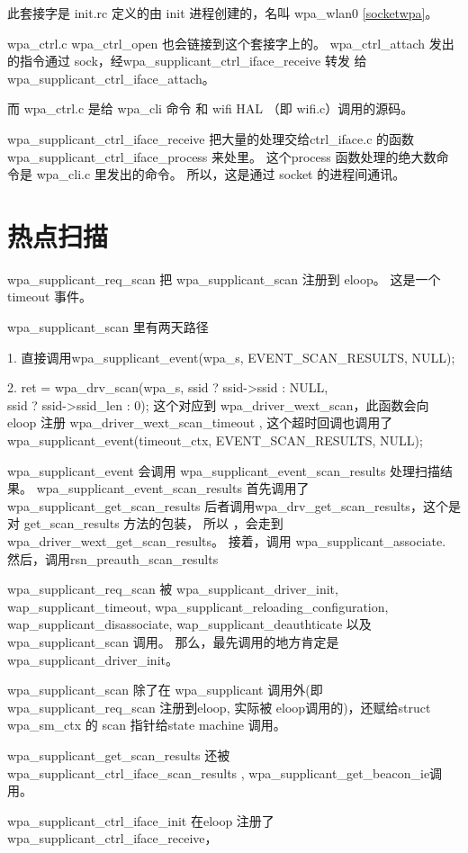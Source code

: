 \documentclass[a4paper,11pt,]{article}%
\begin{document}
此套接字是 init.rc 定义的由 init 进程创建的，名叫 wpa_wlan0 \autoref{socketwpa}。

wpa_ctrl.c wpa_ctrl_open 也会链接到这个套接字上的。
wpa_ctrl_attach 发出的指令通过 sock，经wpa_supplicant_ctrl_iface_receive 转发
给wpa_supplicant_ctrl_iface_attach。

而 wpa_ctrl.c 是给 wpa_cli 命令 和 wifi HAL （即 wifi.c）调用的源码。

wpa_supplicant_ctrl_iface_receive 把大量的处理交给ctrl_iface.c 的函数
wpa_supplicant_ctrl_iface_process 来处里。
这个process 函数处理的绝大数命令是 wpa_cli.c 里发出的命令。
所以，这是通过 socket 的进程间通讯。
\section{热点扫描}

wpa_supplicant_req_scan 把 wpa_supplicant_scan 注册到 eloop。
这是一个timeout 事件。

wpa_supplicant_scan\label{scan} 里有两天路径

1. 直接调用wpa_supplicant_event(wpa_s, EVENT_SCAN_RESULTS, NULL);

2.	ret = wpa_drv_scan(wpa_s, ssid ? ssid->ssid : NULL,\\
				   ssid ? ssid->ssid_len : 0); 
这个对应到 wpa_driver_wext_scan，此函数会向 eloop 注册 wpa_driver_wext_scan_timeout
, 这个超时回调也调用了wpa_supplicant_event(timeout_ctx, EVENT_SCAN_RESULTS, NULL);

wpa_supplicant_event 会调用 wpa_supplicant_event_scan_results 处理扫描结果。
 wpa_supplicant_event_scan_results 首先调用了 wpa_supplicant_get_scan_results
后者调用wpa_drv_get_scan_results，这个是对 get_scan_results 方法的包装， 所以
，会走到 wpa_driver_wext_get_scan_results。
接着，调用 wpa_supplicant_associate.  
然后，调用rsn_preauth_scan_results

wpa_supplicant_req_scan
被 wpa_supplicant_driver_init,
wap_supplicant_timeout,
wpa_supplicant_reloading_configuration,
wap_supplicant_disassociate,
wap_supplicant_deauthticate
以及 wpa_supplicant_scan 调用。
那么，最先调用的地方肯定是 wpa_supplicant_driver_init。

wpa_supplicant_scan
除了在 wpa_supplicant 调用外(即wpa_supplicant_req_scan 注册到eloop, 实际被
eloop调用的)，还赋给struct wpa_sm_ctx 的 scan 指针给state machine 调用。

wpa_supplicant_get_scan_results  还被 
wpa_supplicant_ctrl_iface_scan_results , wpa_supplicant_get_beacon_ie调用。

wpa_supplicant_ctrl_iface_init 在eloop 注册了 wpa_supplicant_ctrl_iface_receive，
\end{document}

